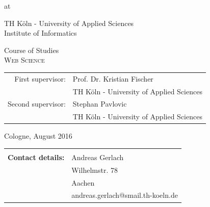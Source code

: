 \begin{titlepage}
\begin{center}
\vspace{0.6cm}

\begin{large}
at\\ 
\vspace{0.2cm}
\begin{scshape}
TH Köln - University of Applied Sciences\\
Institute of Informatics\\
\end{scshape}
\end{large}

\vspace{0.8cm}

\begin{large}
Course of Studies\\ 
\vspace{0.2cm}
\textsc{Web Science}
\end{large}


\vspace{1.0cm}

\begin{tabular}{rl}
        First supervisor:  &  Prof. Dr. Kristian Fischer\\
       					&  \small TH Köln - University of Applied Sciences \\[1.0em]
       Second supervisor:  &  Stephan Pavlovic \\
       					&  \small TH Köln - University of Applied Sciences\\
\end{tabular}

\vspace{0.6cm}

\begin{large}
Cologne, August 2016
\end{large}

\end{center}

\newpage
\thispagestyle{empty}

\begin{center}
\begin{tabular}{rl}
							&  \\[36.0em]
							
\large \textbf{Contact details:}	&  	\quad Andreas Gerlach\\
							&  	\quad Wilhelmstr. 78\\
							&	\quad 52070 Aachen\\
							&  	\quad andreas.gerlach@smail.th-koeln.de\\[2.0em]
							

\end{tabular}
\end{center}
\end{titlepage}
